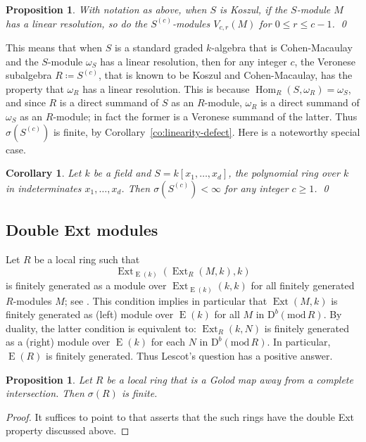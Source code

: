 \documentclass{amsart}
\numberwithin{equation}{section}
\theoremstyle{plain}
\newtheorem{proposition}[equation]{Proposition}
\newtheorem{corollary}[equation]{Corollary}
\theoremstyle{definition}
\theoremstyle{remark}
\newcommand{\dbcat}[1]{\mathrm{D}^b(\mathrm{mod}\,{#1})}
\newcommand{\eee}{\operatorname{E}}
\newcommand{\ext}{\operatorname{Ext}}
\newcommand{\Hom}{\operatorname{Hom}}
\begin{document}
\begin{proposition}
\label{pr:veronese-linear}
With notation as above, when $S$ is Koszul, if the $S$-module $M$ has a linear resolution, so do the $S^{(c)}$-modules $V_{c,r}(M)$ for $0\le r\le c-1$. \qed
\end{proposition}

This means that when $S$ is a standard graded $k$-algebra that is Cohen-Macaulay and the $S$-module $\omega_S$ has a linear resolution, then for any integer $c$, the Veronese subalgebra $R\coloneqq S^{(c)}$, that is known to be Koszul and Cohen-Macaulay, has the property that $\omega_R$ has a linear resolution. This is because $\Hom_R(S,\omega_R)=\omega_S$, and since $R$ is a direct summand of $S$ as an $R$-module, $\omega_R$ is a direct summand of $\omega_S$ as an $R$-module; in fact the former is a Veronese summand of the latter. Thus $\sigma(S^{(c)})$ is finite, by Corollary~\ref{co:linearity-defect}. Here is a noteworthy special case. 

\begin{corollary}
Let $k$ be a field and $S=k[x_1,\dots,x_d]$, the polynomial ring over $k$ in indeterminates $x_1,\dots,x_d$. Then $\sigma(S^{(c)})<\infty$ for any integer $c\ge 1$.  \qed
\end{corollary}

\subsection*{Double Ext modules}
Let  $R$ be a local ring such that 
\[
\ext_{\eee(k)}(\ext_R(M,k),k)
\]
is finitely generated as a module over $\ext_{\eee(k)}(k,k)$ for all finitely generated $R$-modules $M$; see \cite{Backelin/Roos:1986s}. This condition implies in particular that $\ext(M,k)$ is finitely generated as (left) module over $\eee(k)$ for all $M$ in $\dbcat{R}$. By duality, the latter condition is equivalent to: $\ext_R(k,N)$ is finitely generated as a (right) module over $\eee(k)$ for each $N$ in $\dbcat R$. In particular, $\eee(R)$ is finitely generated. Thus Lescot's question has a positive answer. 
    
    \begin{proposition}
    \label{pr:Roos-rings}
    Let $R$ be a local ring that is a  Golod map away from a complete intersection.
    Then $\sigma(R)$ is finite.
    \end{proposition}

    \begin{proof}
    It suffices to point to \cite[Theorem~2, ]{Backelin/Roos:1986s} that asserts that the such rings have the double Ext property discussed above.
    \end{proof}
\end{document}
